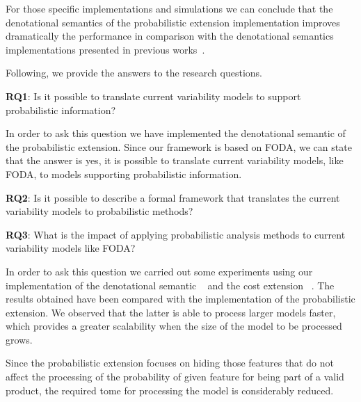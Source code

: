 For those specific implementations and
simulations we can conclude
that the denotational semantics of the probabilistic
extension implementation improves dramatically
the performance
in comparison with the denotational semantics implementations
presented in previous works~\cite{acl13,clc16}.


Following, we provide the answers to the research questions.

\textbf{RQ1}: Is it possible to translate current variability models to support 
probabilistic information?

In order to ask this question we have implemented the denotational semantic
of the probabilistic extension. Since our framework is based on FODA, we
can state that the answer is yes, it is possible to translate current
variability models, like FODA, to models supporting probabilistic
information.

\textbf{RQ2}: Is it possible to describe a formal framework that translates 
the current variability models to probabilistic methods?


\textbf{RQ3}: What is the impact of applying probabilistic analysis methods 
to current variability models like FODA?

In order to ask this question we carried out some experiments using
our implementation of the denotational semantic \fodaPA~\cite{acl13}
and the cost extension \fodaPAc~\cite{clc16}. The results obtained
have been compared with the implementation of the probabilistic 
extension. We observed that the latter is able to process larger 
models faster, which provides a greater scalability when
the size of the model to be processed grows.

Since the probabilistic extension focuses on hiding  those features 
that do not affect the processing of the probability of given feature 
for being part of a valid product, the required tome for processing the
model is considerably reduced.



